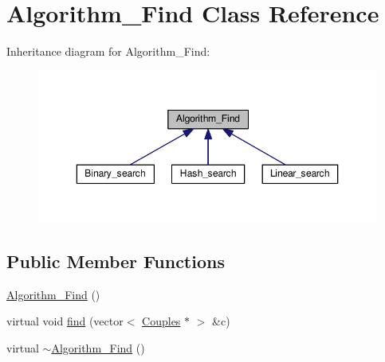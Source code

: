\hypertarget{class_algorithm___find}{\section{Algorithm\-\_\-\-Find Class Reference}
\label{class_algorithm___find}
}


Inheritance diagram for Algorithm\-\_\-\-Find\-:
\nopagebreak
\begin{figure}[H]
\begin{center}
\leavevmode
\includegraphics[width=346pt]{class_algorithm___find__inherit__graph}
\end{center}
\end{figure}
\subsection*{Public Member Functions}
\begin{DoxyCompactItemize}
\item 
\hyperlink{class_algorithm___find_afc04e4e5c3608b0ab709d48deeb0ce93}{Algorithm\-\_\-\-Find} ()
\item 
virtual void \hyperlink{class_algorithm___find_aabdd8c1d9dba0d5482382902def6eae8}{find} (vector$<$ \hyperlink{class_couples}{Couples} $\ast$ $>$ \&c)
\item 
virtual \hyperlink{class_algorithm___find_a078b654604e5a94613729f7cfa27f7f1}{$\sim$\-Algorithm\-\_\-\-Find} ()
\end{DoxyCompactItemize}


